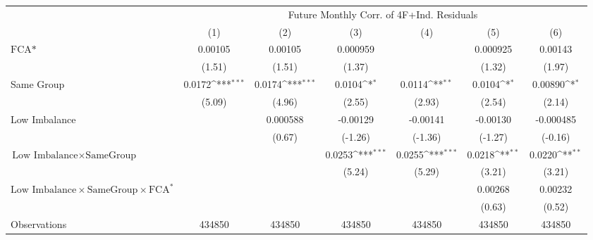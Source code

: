 {
\def\sym#1{\ifmmode^{#1}\else\(^{#1}\)\fi}
\begin{tabular}{l*{6}{c}}
\hline\hline
                &\multicolumn{6}{c}{Future Monthly Corr. of 4F+Ind. Residuals}                                                    \\\cmidrule(lr){2-7}
                &\multicolumn{1}{c}{(1)}         &\multicolumn{1}{c}{(2)}         &\multicolumn{1}{c}{(3)}         &\multicolumn{1}{c}{(4)}         &\multicolumn{1}{c}{(5)}         &\multicolumn{1}{c}{(6)}         \\
\hline
$ \text{FCA*} $ &  0.00105         &  0.00105         & 0.000959         &                  & 0.000925         &  0.00143         \\
                &   (1.51)         &   (1.51)         &   (1.37)         &                  &   (1.32)         &   (1.97)         \\
[1em]
Same Group      &   0.0172\sym{***}&   0.0174\sym{***}&   0.0104\sym{*}  &   0.0114\sym{**} &   0.0104\sym{*}  &  0.00890\sym{*}  \\
                &   (5.09)         &   (4.96)         &   (2.55)         &   (2.93)         &   (2.54)         &   (2.14)         \\
[1em]
Low Imbalance   &                  & 0.000588         & -0.00129         & -0.00141         & -0.00130         &-0.000485         \\
                &                  &   (0.67)         &  (-1.26)         &  (-1.36)         &  (-1.27)         &  (-0.16)         \\
[1em]
 $ \text{Low Imbalance} \times {\text{SameGroup} } $ &                  &                  &   0.0253\sym{***}&   0.0255\sym{***}&   0.0218\sym{**} &   0.0220\sym{**} \\
                &                  &                  &   (5.24)         &   (5.29)         &   (3.21)         &   (3.21)         \\
[1em]
 $ \text{Low Imbalance} \times {\text{SameGroup} } \times \text{FCA}^*  $ &                  &                  &                  &                  &  0.00268         &  0.00232         \\
                &                  &                  &                  &                  &   (0.63)         &   (0.52)         \\
\hline
Observations    &   434850         &   434850         &   434850         &   434850         &   434850         &   434850         \\

\end{tabular}}
